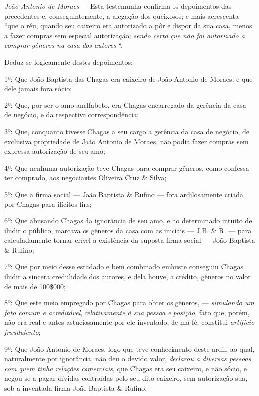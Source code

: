 \emph{João Antonio de Moraes} --- Esta testemunha confirma os
depoimentos das precedentes e, conseguintemente, a alegação dos
queixosos; e mais acrescenta --- ``que o réu, quando seu caixeiro era
autorizado a pôr e dispor da sua casa, menos a fazer compras sem
especial autorização; \emph{sendo certo que não foi autorizado a comprar
gêneros na casa dos autores} ``.

\asterisc{}

Deduz-se logicamente destes depoimentos:

1º: Que João Baptista das Chagas era caixeiro de João Antonio de Moraes,
e que dele jamais fora sócio;

2º: Que, por ser o amo analfabeto, era Chagas encarregado da gerência da
casa de negócio, e da respectiva correspondência;

3º: Que, conquanto tivesse Chagas a seu cargo a gerência da casa de
negócio, de exclusiva propriedade de João Antonio de Moraes, não podia
fazer compras sem expressa autorização de seu amo;

4º: Que nenhuma autorização teve Chagas para comprar gêneros, como
confessa ter comprado, aos negociantes Oliveira Cruz \& Silva;

5º: Que a firma social --- João Baptista \& Rufino --- fora ardilosamente
criada por Chagas para ilícitos fins;

6º: Que abusando Chagas da ignorância de seu amo, e no determinado
intuito de iludir o público, marcava os gêneros da casa com as iniciais
--- J.B. \& R. --- para calculadamente tornar crível a existência da suposta
firma social --- João Baptista \& Rufino;

7º: Que por meio desse estudado e bem combinado embuste conseguiu Chagas
iludir a sincera credulidade dos autores, e dela houve, a crédito,
gêneros no valor de mais de 100\$000;

8º: Que este meio empregado por Chagas para obter os gêneros, ---
\emph{simulando um fato comum e acreditável}, \emph{relativamente à sua
pessoa e posição}, fato que, porém, não era real e antes astuciosamente
por ele inventado, de má fé, constitui \emph{artifício fraudulento};

9º: Que João Antonio de Moraes, logo que teve conhecimento deste ardil,
ao qual, naturalmente por ignorância, não deu o devido valor,
\emph{declarou a diversas pessoas com quem tinha relações comerciais},
que Chagas era seu caixeiro, e não sócio, e negou-se a pagar dívidas
contraídas pelo seu dito caixeiro, sem autorização sua, sob a inventada
firma João Baptista \& Rufino.

